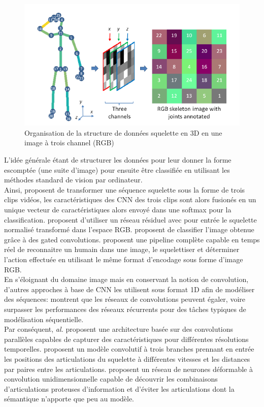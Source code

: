 \begin{figure}[H]
    \centering
    \includegraphics[width=0.5\linewidth]{Images/skeltoim.png}
    \caption{Organisation de la structure de données squelette en 3D en une image à trois channel (RGB)}
    \label{fig:skeltoim}
\end{figure}
L’idée générale étant de structurer les données pour leur donner la forme escomptée (une suite d’image) pour ensuite être classifiée en utilisant les méthodes standard de vision par ordinateur.\\


Ainsi, \cite{ke2017new} proposent de transformer une séquence squelette sous la forme de trois clips vidéos, les caractéristiques des CNN des trois clips sont alors fusionés en un unique vecteur de caractéristiques alors envoyé dans une softmax pour la classification.
\cite{pham2018learning} proposent d'utiliser un réseau résiduel \cite{he2016deep} avec pour entrée le squelette normalisé transformé dans l'espace RGB.
\cite{cao2018skeleton} proposent de classifier l'image obtenue grâce à des gated convolutions.
\cite{ludl2019simple} proposent une pipeline complète capable en temps réel de reconnaitre un humain dans une image, le squelettiser et déterminer l'action effectuée en utilisant le même format d'encodage sous forme d'image RGB.\\

En s'éloignant du domaine image mais en conservant la notion de convolution, d'autres approches à base de CNN les utilisent sous format 1D afin de modéliser des séquences:
\cite{bai2018empirical} montrent que les réseaux de convolutions peuvent égaler, voire surpasser les performances des réseaux récurrents pour des tâches typiques de modélisation séquentielle.\\

Par conséquent, \textit{ al.} \cite{devineau2018deep} proposent une architecture basée sur des convolutions parallèles capables de capturer des caractéristiques pour différentes résolutions temporelles.
\cite{2019arXiv190709658Y} proposent un modèle convolutif à trois branches prennant en entrée les positions des articulations du squelette à différentes vitesses et les distances par paires entre les articulations.
\cite{weng2018deformable} proposent un réseau de neurones déformable à convolution unidimensionnelle capable de découvrir les combinaisons d'articulations proteuses d'information et d'éviter les articulations dont la sémantique n'apporte que peu au modèle.



